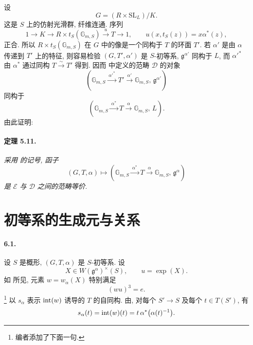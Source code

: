 设
\[
 G=(R\times\mathrm{SL}_L)/K.
\]
这是 \(S\) 上的仿射光滑群, 纤维连通. 序列
\[
 1\longrightarrow K\longrightarrow
 R\times t_S(\mathbb G_{m,S})
 \xrightarrow{\ u\ }T\longrightarrow1,
 \qquad
 u(x,t_S(z))=x\alpha^\ast(z),
\]
正合. 所以 \(R\times t_S(\mathbb G_{m,S})\) 在 \(G\) 中的像是一个同构于 \(T\) 的环面 \(T'\). 若 \(\alpha'\) 是由 \(\alpha\) 传递到 \(T'\) 上的特征, 则容易检验 \((G,T',\alpha')\) 是 \(S\)-初等系, \(\mathfrak g^{\alpha'}\) 同构于 \(L\), 而 \(\alpha'^\ast\) 由 \(\alpha^\ast\) 通过同构 \(T\xrightarrow{\sim}T'\) 得到. 因而  中定义的范畴 \(\mathcal D\) 的对象
\[
 \left(
 \mathbb G_{m,S}\xrightarrow{\ \alpha'^\ast\ }T'
 \xrightarrow{\ \alpha'\ }\mathbb G_{m,S},\,
 \mathfrak g^{\alpha'}
 \right)
\]
同构于
\[
 \left(
 \mathbb G_{m,S}\xrightarrow{\ \alpha^\ast\ }T
 \xrightarrow{\ \alpha\ }\mathbb G_{m,S},\,L
 \right).
 \]
由此证明:

\paragraph{\textbf{定理 5.11.}}
\emph{采用  的记号, 函子}
\[
 (G,T,\alpha)\longmapsto
 \left(
 \mathbb G_{m,S}\xrightarrow{\ \alpha^\ast\ }T
 \xrightarrow{\ \alpha\ }\mathbb G_{m,S},\,
 \mathfrak g^\alpha
 \right)
\]
\emph{是 \(\mathcal E\) 与 \(\mathcal D\) 之间的范畴等价.}

\section{初等系的生成元与关系}
\paragraph{\textbf{6.1.}}
设 \(S\) 是概形, \((G,T,\alpha)\) 是 \(S\)-初等系. 设
\[
 X\in W(\mathfrak g^\alpha)^\times(S),
 \qquad u=\exp(X).
\]
如  所见, 元素 \(w=w_\alpha(X)\) 特别满足
\[
 (wu)^3=e.
\]
\footnote{编者添加了下面一句.}
以 \(s_\alpha\) 表示 \(\operatorname{int}(w)\) 诱导的 \(T\) 的自同构. 由\textup{}, 对每个 \(S'\to S\) 及每个 \(t\in T(S')\), 有
\[
 s_\alpha(t)=\operatorname{int}(w)(t)
 =t\,\alpha^\ast\bigl(\alpha(t)^{-1}\bigr).
\]


